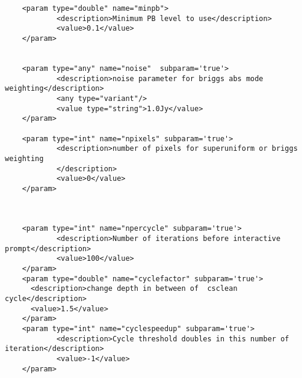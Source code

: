 \begin{verbatim}
    <param type="double" name="minpb">
            <description>Minimum PB level to use</description>
            <value>0.1</value>
    </param>


    <param type="any" name="noise"  subparam='true'>
            <description>noise parameter for briggs abs mode weighting</description>
            <any type="variant"/>
            <value type="string">1.0Jy</value>      
    </param>

    <param type="int" name="npixels" subparam='true'>
            <description>number of pixels for superuniform or briggs weighting
            </description>
            <value>0</value>
    </param>



    <param type="int" name="npercycle" subparam='true'>
            <description>Number of iterations before interactive prompt</description>
            <value>100</value>
    </param>
    <param type="double" name="cyclefactor" subparam='true'>
      <description>change depth in between of  csclean cycle</description>
      <value>1.5</value>
    </param>
    <param type="int" name="cyclespeedup" subparam='true'>
            <description>Cycle threshold doubles in this number of iteration</description>
            <value>-1</value>
    </param>
    

    


\end{verbatim}
